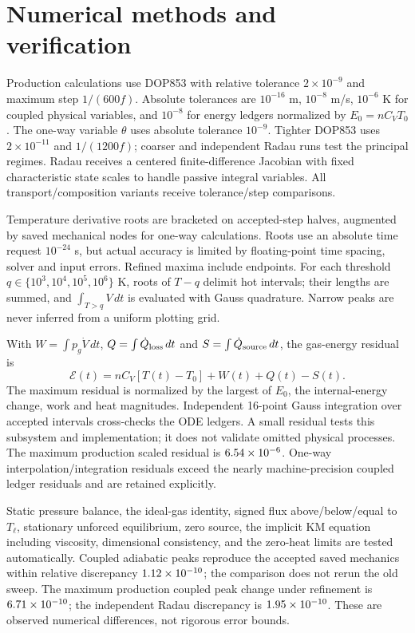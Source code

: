 \documentclass[10pt,a4paper]{article}
\begin{document}
\newpage
\section{Numerical methods and verification}
Production calculations use DOP853 with relative tolerance $2\times10^{-9}$ and maximum step $1/(600f)$. Absolute tolerances are $10^{-16}$ m, $10^{-8}$ m/s, $10^{-6}$ K for coupled physical variables, and $10^{-8}$ for energy ledgers normalized by $E_0=nC_VT_0$. The one-way variable $\theta$ uses absolute tolerance $10^{-9}$. Tighter DOP853 uses $2\times10^{-11}$ and $1/(1200f)$; coarser and independent Radau runs test the principal regimes. Radau receives a centered finite-difference Jacobian with fixed characteristic state scales to handle passive integral variables. All transport/composition variants receive tolerance/step comparisons.

Temperature derivative roots are bracketed on accepted-step halves, augmented by saved mechanical nodes for one-way calculations. Roots use an absolute time request $10^{-24}$ s, but actual accuracy is limited by floating-point time spacing, solver and input errors. Refined maxima include endpoints. For each threshold $q\in\{10^3,10^4,10^5,10^6\}$ K, roots of $T-q$ delimit hot intervals; their lengths are summed, and $\int_{T>q}V\,dt$ is evaluated with Gauss quadrature. Narrow peaks are never inferred from a uniform plotting grid.

With $W=\int p_g\dot V\,dt$, $Q=\int\dot Q_{\rm loss}\,dt$ and $S=\int\dot Q_{\rm source}\,dt$, the gas-energy residual is
\begin{equation}
\mathcal E(t)=nC_V[T(t)-T_0]+W(t)+Q(t)-S(t).
\end{equation}
The maximum residual is normalized by the largest of $E_0$, the internal-energy change, work and heat magnitudes. Independent 16-point Gauss integration over accepted intervals cross-checks the ODE ledgers. A small residual tests this subsystem and implementation; it does not validate omitted physical processes. The maximum production scaled residual is $6.54\times10^{-6}$. One-way interpolation/integration residuals exceed the nearly machine-precision coupled ledger residuals and are retained explicitly.

Static pressure balance, the ideal-gas identity, signed flux above/below/equal to $T_\ell$, stationary unforced equilibrium, zero source, the implicit KM equation including viscosity, dimensional consistency, and the zero-heat limits are tested automatically. Coupled adiabatic peaks reproduce the accepted saved mechanics within relative discrepancy $1.12\times10^{-10}$; the comparison does not rerun the old sweep. The maximum production coupled peak change under refinement is $6.71\times10^{-10}$; the independent Radau discrepancy is $1.95\times10^{-10}$. These are observed numerical differences, not rigorous error bounds.
\end{document}
